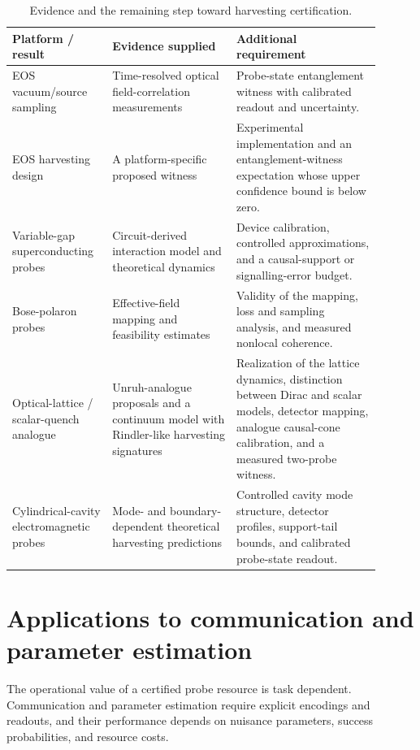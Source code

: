 \documentclass[pdflatex,sn-mathphys-num]{sn-jnl}
\begin{document}
\begin{table}[htbp]
\centering\small
\caption{Evidence and the remaining step toward harvesting certification.}
\label{tab:platform-evidence}
\begin{tabular}{L{0.23\linewidth}L{0.31\linewidth}L{0.36\linewidth}}
\toprule
Platform / result & Evidence supplied & Additional requirement\\
\midrule
EOS vacuum/source sampling \cite{Herter2026VacuumSource} & Time-resolved optical field-correlation measurements & Probe-state entanglement witness with calibrated readout and uncertainty.\\
EOS harvesting design \cite{Lindel2024} & A platform-specific proposed witness & Experimental implementation and an entanglement-witness expectation whose upper confidence bound is below zero.\\
Variable-gap superconducting probes \cite{TeixidoBonfill2026} & Circuit-derived interaction model and theoretical dynamics & Device calibration, controlled approximations, and a causal-support or signalling-error budget.\\
Bose-polaron probes \cite{PercheGozzini2026} & Effective-field mapping and feasibility estimates & Validity of the mapping, loss and sampling analysis, and measured nonlocal coherence.\\
Optical-lattice / scalar-quench analogue \cite{RodriguezLaguna2017,KosiorLewensteinCeli2018,Louko2018RindlerQuench,LopezRavenMannLouko2025} & Unruh-analogue proposals and a continuum model with Rindler-like harvesting signatures & Realization of the lattice dynamics, distinction between Dirac and scalar models, detector mapping, analogue causal-cone calibration, and a measured two-probe witness.\\
Cylindrical-cavity electromagnetic probes \cite{StrohleMomcilovic2026} & Mode- and boundary-dependent theoretical harvesting predictions & Controlled cavity mode structure, detector profiles, support-tail bounds, and calibrated probe-state readout.\\
\bottomrule
\end{tabular}
\end{table}

\section{Applications to communication and parameter estimation}
\label{sec:utility}
The operational value of a certified probe resource is task dependent. Communication and parameter estimation require explicit encodings and readouts, and their performance depends on nuisance parameters, success probabilities, and resource costs.
\end{document}
